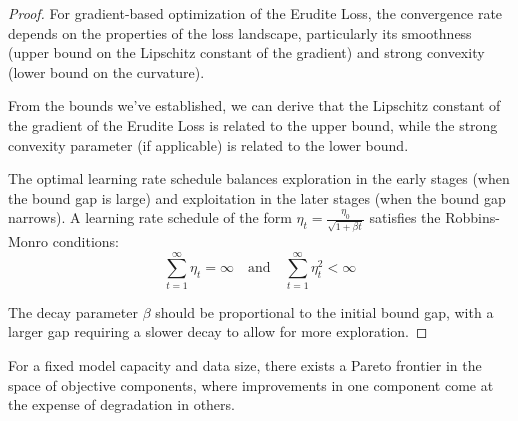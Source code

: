 \begin{proof}
For gradient-based optimization of the Erudite Loss, the convergence rate depends on the properties of the loss landscape, particularly its smoothness (upper bound on the Lipschitz constant of the gradient) and strong convexity (lower bound on the curvature).

From the bounds we've established, we can derive that the Lipschitz constant of the gradient of the Erudite Loss is related to the upper bound, while the strong convexity parameter (if applicable) is related to the lower bound.

The optimal learning rate schedule balances exploration in the early stages (when the bound gap is large) and exploitation in the later stages (when the bound gap narrows). A learning rate schedule of the form $\eta_t = \frac{\eta_0}{\sqrt{1 + \beta t}}$ satisfies the Robbins-Monro conditions:
\begin{equation}
\sum_{t=1}^{\infty} \eta_t = \infty \quad \text{and} \quad \sum_{t=1}^{\infty} \eta_t^2 < \infty
\end{equation}

The decay parameter $\beta$ should be proportional to the initial bound gap, with a larger gap requiring a slower decay to allow for more exploration.
\end{proof}

\begin{theorem}
For a fixed model capacity and data size, there exists a Pareto frontier in the space of objective components, where improvements in one component come at the expense of degradation in others.
\end{theorem}

